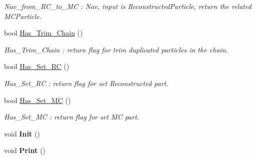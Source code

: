 \begin{DoxyCompactItemize}
\begin{DoxyCompactList}\small\item\em Nav\_\-from\_\-RC\_\-to\_\-MC : Nav, input is ReconstructedParticle, return the related MCParticle. \item\end{DoxyCompactList}\item 
bool \hyperlink{classToolSet_1_1CChain__Single_a237f2bcfb3006f37363ae6e4e39bbb44}{Has\_\-Trim\_\-Chain} ()
\begin{DoxyCompactList}\small\item\em Has\_\-Trim\_\-Chain : return flag for trim duplicated particles in the chain. \item\end{DoxyCompactList}\item 
bool \hyperlink{classToolSet_1_1CChain__Single_ac908ef21df959857275fe1de00c76e2c}{Has\_\-Set\_\-RC} ()
\begin{DoxyCompactList}\small\item\em Has\_\-Set\_\-RC : return flag for set Reconstructed part. \item\end{DoxyCompactList}\item 
bool \hyperlink{classToolSet_1_1CChain__Single_aa6b5eb85cc8d0505234cc6da2391fbbd}{Has\_\-Set\_\-MC} ()
\begin{DoxyCompactList}\small\item\em Has\_\-Set\_\-MC : return flag for set MC part. \item\end{DoxyCompactList}\item 
\hypertarget{classToolSet_1_1CChain__Single_ae9e486b24886dded2566ab5624a540d5}{
void {\bfseries Init} ()}
\label{classToolSet_1_1CChain__Single_ae9e486b24886dded2566ab5624a540d5}

\item 
\hypertarget{classToolSet_1_1CChain__Single_aa793de1adde25ecd45259b2a858d6e68}{
void {\bfseries Print} ()}
\label{classToolSet_1_1CChain__Single_aa793de1adde25ecd45259b2a858d6e68}


\end{DoxyCompactItemize}

